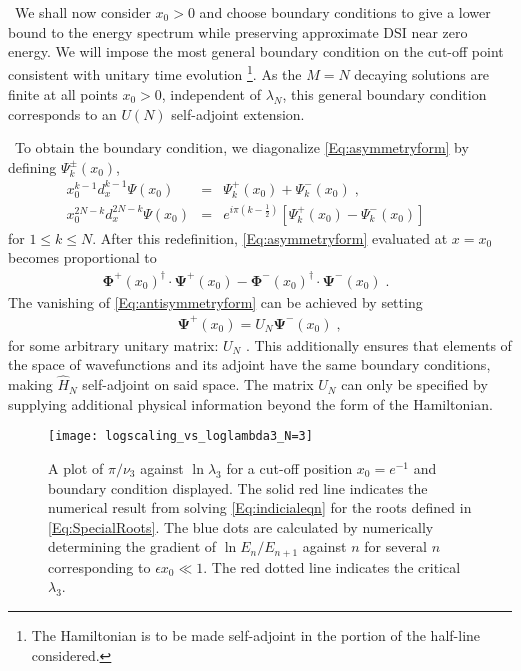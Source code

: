 \documentclass[aps,prl,reprint,preprintnumbers]{revtex4-1}
\renewcommand{\vec}[1]{\boldsymbol{#1}}
\begin{document}
{\ We shall now consider $x_{0}>0$ and choose boundary conditions to give a lower bound to the energy spectrum while preserving approximate DSI near zero energy. We will impose the most general boundary condition on the cut-off point consistent with unitary time evolution \footnote{The Hamiltonian is to be made self-adjoint in the portion of the half-line considered.}. As the $M=N$ decaying solutions are finite at all points $x_{0}>0$, independent of $\lambda_{N}$, this general boundary condition corresponds to an $U(N)$ self-adjoint extension.}

{\ To obtain the boundary condition, we diagonalize \eqref{Eq:asymmetryform} by defining $\Psi_{k}^{\pm}(x_{0})$,
  \begin{eqnarray}
   \label{Eq:diagonalise}
	 x_{0}^{k-1} d_{x}^{k-1} \Psi(x_{0})
     &=& \Psi_{k}^{+}(x_{0}) + \Psi_{k}^{-}(x_{0}) \; ,  \\
	 x_{0}^{2N-k} d_{x}^{2N-k} \Psi(x_{0})
     &=& e^{i \pi (k-\frac{1}{2})} \left[ \Psi_{k}^{+}(x_{0}) - \Psi_{k}^{-}(x_{0}) \right] \qquad 
  \end{eqnarray}
for $1 \leq k \leq N$. After this redefinition, \eqref{Eq:asymmetryform} evaluated at $x=x_{0}$ becomes proportional to
  \begin{eqnarray}
	\label{Eq:antisymmetryform}
	\vec{\Phi}^{+}(x_{0})^{\dagger} \cdot  \vec{\Psi}^{+}(x_{0}) - \vec{\Phi}^{-}(x_{0})^{\dagger} \cdot \vec{\Psi}^{-}(x_{0}) \; .  \qquad
  \end{eqnarray}
The vanishing of \eqref{Eq:antisymmetryform} can be achieved by setting
  \begin{eqnarray}
   \label{Eq:GenericUnBoundaryCondition}
   \vec{\Psi}^{+}(x_{0}) = U_{N} \vec{\Psi}^{-}(x_{0}) \; , 
  \end{eqnarray}
for some arbitrary unitary matrix: $U_{N}$ \cite{Gitman:2009era,9780817646622}. This additionally ensures that elements of the space of wavefunctions and its adjoint have the same boundary conditions, making $\hat{H}_{N}$ self-adjoint on said space. The matrix $U_{N}$ can only be specified by supplying additional physical information beyond the form of the Hamiltonian.}

\begin{figure}[!t]
  \centering
  \texttt{[image: logscaling\_vs\_loglambda3\_N=3]}
  \caption{A plot of $\pi / \nu_{3}$ against $\ln \lambda_{3}$ for a cut-off position $x_{0} = e^{-1}$ and boundary condition displayed. The solid red line indicates the numerical result from solving \eqref{Eq:indicialeqn} for the roots defined in \eqref{Eq:SpecialRoots}. The blue dots are calculated by numerically determining the gradient of $\ln E_{n}/E_{n+1}$ against $n$ for several $n$ corresponding to $\epsilon x_{0} \ll 1$. The red dotted line indicates the critical $\lambda_{3}$.}
  \label{fig:N=6cutoff}
  \vspace{-1em}
\end{figure}
\end{document}
